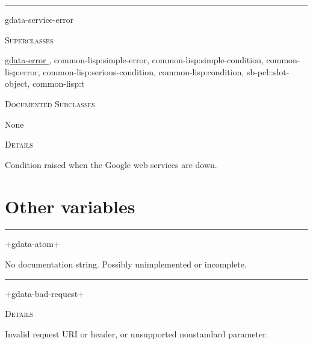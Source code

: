 \documentclass[a4paper]{report}
\begin{document}
  

    \rule{\linewidth}{0.1mm}
    
    \label{cl-gdata-service__class__gdata-service-error}
    \begin{defun}[Class]
    gdata-service-error


      
    \bigskip
    \textsc{Superclasses}

\hyperref[cl-gdata-service__class__gdata-error]{
	  gdata-error
	}
      , \color[rgb]{0.5,0.5,0.5}common-lisp:simple-error\color[rgb]{0,0,0}, \color[rgb]{0.5,0.5,0.5}common-lisp:simple-condition\color[rgb]{0,0,0}, \color[rgb]{0.5,0.5,0.5}common-lisp:error\color[rgb]{0,0,0}, \color[rgb]{0.5,0.5,0.5}common-lisp:serious-condition\color[rgb]{0,0,0}, \color[rgb]{0.5,0.5,0.5}common-lisp:condition\color[rgb]{0,0,0}, \color[rgb]{0.5,0.5,0.5}sb-pcl::slot-object\color[rgb]{0,0,0}, \color[rgb]{0.5,0.5,0.5}common-lisp:t\color[rgb]{0,0,0}


      
    \bigskip
    \textsc{Documented Subclasses}


	    None
	  


	
    \bigskip
    \textsc{Details}

Condition raised when the Google web services are down.


    
    \end{defun}
  
  
      \section{Other variables}
      

    \rule{\linewidth}{0.1mm}
    
    \label{cl-gdata-service__variable__+gdata-atom+}
    \begin{defun}[Variable]
    +gdata-atom+


	No documentation string.  Possibly unimplemented or incomplete.
	


    
    \end{defun}
  
  

    \rule{\linewidth}{0.1mm}
    
    \label{cl-gdata-service__variable__+gdata-bad-request+}
    \begin{defun}[Variable]
    +gdata-bad-request+


	
    \bigskip
    \textsc{Details}

Invalid request URI or header, or unsupported nonstandard parameter.


    
    \end{defun}
  
\end{document}
